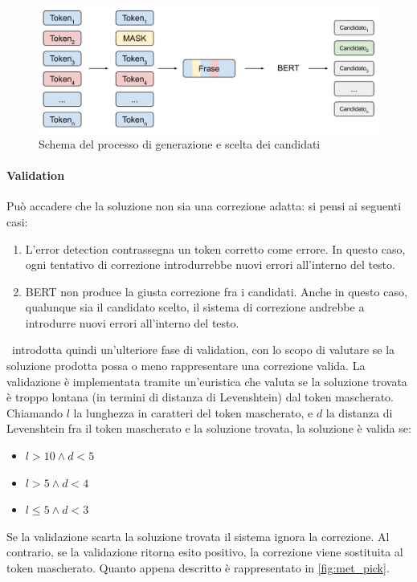 \begin{figure}[H]
\centering
\includegraphics[width=\textwidth]{immagini/metodologia/generazione_candidati}
\caption{Schema del processo di generazione e scelta dei candidati}
\label{fig:met_errgen}
\end{figure}

\paragraph{Validation}
Può accadere che la soluzione non sia una correzione adatta: si pensi ai seguenti casi:
\begin{enumerate}
\item L'error detection contrassegna un token corretto come errore. In questo caso, ogni tentativo di correzione introdurrebbe nuovi errori all'interno del testo.
\item BERT non produce la giusta correzione fra i candidati. Anche in questo caso, qualunque sia il candidato scelto, il sistema di correzione andrebbe a introdurre nuovi errori all'interno del testo.
\end{enumerate}

\E\ introdotta quindi un'ulteriore fase di validation, con lo scopo di valutare se la soluzione prodotta possa o meno rappresentare una correzione valida. La validazione è implementata tramite un'euristica che valuta se la soluzione trovata è troppo lontana (in termini di distanza di Levenshtein) dal token mascherato. Chiamando $l$ la lunghezza in caratteri del token mascherato, e $d$ la distanza di Levenshtein fra il token mascherato e la soluzione trovata, la soluzione è valida se:
\begin{itemize}
\item $l > 10 \wedge d < 5$ 
\item $l > 5 \wedge d < 4$ 
\item $l \leqslant 5 \wedge d < 3$ 
\end{itemize}
Se la validazione scarta la soluzione trovata il sistema ignora la correzione. Al contrario, se la validazione ritorna esito positivo, la correzione viene sostituita al token mascherato. Quanto appena descritto è rappresentato in \autoref{fig:met_pick}.


